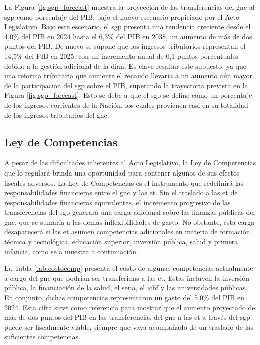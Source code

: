 

La Figura \ref{fig:sgp_forecast} muestra la proyección de las transferencias del \gls{gnc} al \gls{sgp} como porcentaje del PIB, bajo el nuevo escenario propiciado por el Acto Legislativo. Bajo este escenario, el \gls{sgp} presenta una tendencia creciente desde el 4,0\% del PIB en 2024 hasta el 6,3\% del PIB en 2038, un aumento de más de dos puntos del PIB. De nuevo se supone que los ingresos tributarios representan el 14,5\% del PIB en 2025, con un incremento anual de 0,1 puntos porcentuales debido a la gestión adicional de la \gls{dian}. Es clave resaltar este supuesto, ya que una reforma tributaria que aumente el recaudo llevaría a un aumento aún mayor de la participación del  \gls{sgp} sobre el PIB, superando la trayectoria prevista en la Figura \ref{fig:sgp_forecast}. Esto se debe a que el \gls{sgp} se define como un porcentaje de los ingresos corrientes de la Nación, los cuales provienen casi en su totalidad de los ingresos tributarios del \gls{gnc}. 

\subsection{Ley de Competencias}

A pesar de las dificultades inherentes al Acto Legislativo, la Ley de Competencias que lo regulará  brinda una oportunidad para contener algunos de sus efectos fiscales adversos. La Ley de Competencias es el instrumento que redefinirá las responsabilidades financieras entre el \gls{gnc} y las \gls{et}. Sin el traslado a las \gls{et} de responsabilidades financieras equivalentes, el incremento progresivo de las transferencias del \gls{sgp} generará una carga adicional sobre las finanzas públicas del \gls{gnc}, que se sumaría a las demás inflexibilidades de gasto. No obstante, esta carga desaparecerá si las \gls{et} asumen competencias adicionales en materia de formación técnica y tecnológica, educación superior, inversión pública, salud y primera infancia, como se a muestra a continuación.



La Tabla \ref{tab:costocomp} presenta el costo de algunas competencias actualmente a cargo del \gls{gnc} que podrían ser transferidas a las \gls{et}. Estas incluyen la inversión pública, la financiación de la salud, el \gls{sena}, el \gls{icbf} y las universidades públicas. En conjunto, dichas competencias representaron un gasto del 5,0\% del PIB en 2024. Esta cifra sirve como referencia para mostrar que el aumento proyectado de más de dos puntos del PIB en las transferencias del \gls{gnc} a las \gls{et} a través del \gls{sgp} puede ser fiscalmente viable, siempre que vaya acompañado de un traslado de las suficientes competencias.

